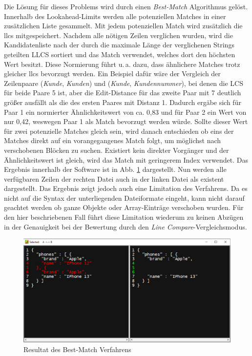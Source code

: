 Die Lösung für dieses Problems wird durch einen \textit{Best-Match} Algorithmus gelöst. Innerhalb des Lookahead-Limits werden alle potenziellen Matches in einer zusätzlichen Liste gesammelt. Mit jedem potenziellen Match wird zusätzlich die \acrshort{llcs} mitgespeichert. Nachdem alle nötigen Zeilen verglichen wurden, wird die Kandidatenliste nach der durch die maximale Länge der verglichenen Strings geteilten LLCS sortiert und das Match verwendet, welches dort den höchsten Wert besitzt. Diese Normierung führt u.\,a. dazu, dass ähnlichere Matches trotz gleicher \acrshort{llcs} bevorzugt werden. Ein Beispiel dafür wäre der Vergleich der Zeilenpaare (\emph{Kunde}, \emph{Kunden}) und (\emph{Kunde}, \emph{Kundennummer}), bei denen die LCS für beide Paare 5 ist, aber die Edit-Distance für das zweite Paar mit 7 deutlich größer ausfällt als die des ersten Paares mit Distanz 1. Dadurch ergäbe sich für Paar 1 ein normierter Ähnlichkeitswert von ca. 0,83 und für Paar 2 ein Wert von nur 0,42, weswegen Paar 1 als Match bevorzugt werden würde. Sollte dieser Wert für zwei potenzielle Matches gleich sein, wird danach entschieden ob eins der Matches direkt auf ein vorangegangenes Match folgt, um möglichst nach verschobenen Blöcken zu suchen. Existiert kein direkter Vorgänger und der Ähnlichkeitswert ist gleich, wird das Match mit geringerem Index verwendet. Das Ergebnis innerhalb der Software ist in Abb. \ref{fig:bestMatchResult} dargestellt. Nun werden alle verfügbaren Zeilen der rechten Datei auch in der linken Datei als existent dargestellt. Das Ergebnis zeigt jedoch auch eine Limitation des Verfahrens. Da es nicht auf die Syntax der unterliegenden Dateiformate eingeht, kann nicht darauf geachtet werden ob ganze Objekte oder Array-Einträge verschoben wurden. Für den hier beschriebenen Fall führt diese Limitation wiederum zu keinen Abzügen in der Genauigkeit bei der Bewertung durch den \emph{Line Compare}-Vergleichsmodus.

\begin{figure}[]
    \centering
    \includegraphics[width=\textwidth]{images/Best Match updated.png}
    \caption{Resultat des Best-Match Verfahrens}
    \label{fig:bestMatchResult}
\end{figure}

